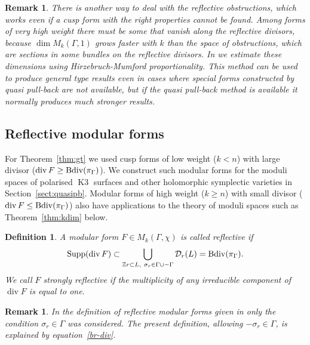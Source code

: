 \documentclass[a4paper,11pt]{article}
\newtheorem{definition}[lemma]{Definition}
\newtheorem{remark}[lemma]{Remark}
\newcommand{\ZZ}{\mathbb Z}
\renewcommand{\cD}{\mathcal D}
\newcommand{\supp}{\mathop{\null\mathrm {Supp}}\nolimits}
\newcommand{\Bdiv}{\mathop{\null\mathrm {Bdiv}}\nolimits}
\renewcommand{\div}{\mathop{\mathrm {div}}\nolimits}
\newcommand{\Kthree}{\mathop{\mathrm {K3}}\nolimits}
\begin{document}
\begin{remark}\label{rem:hm}
There is another way to deal with the reflective obstructions, which
works even if a cusp form with the right properties cannot be
found. Among forms of very high weight there must be some that vanish
along the reflective divisors, because $\dim M_k(\Gamma,1)$ grows
faster with $k$ than the space of obstructions, which are sections in
some bundles on the reflective divisors. In \cite{GHSprop} we estimate
these dimensions using Hirzebruch-Mumford proportionality. This method
can be used to produce general type results even in cases where
special forms constructed by quasi pull-back are not available, but
if the quasi pull-back method is available it normally produces much
stronger results.
\end{remark}

\subsection{Reflective modular forms}\label{subsect:reflectivemodfm}

For Theorem~\ref{thm:gt} we used cusp forms of low weight ($k<n$)
with large divisor ($\div F  \ge  \Bdiv(\pi_\Gamma)$).
We construct such modular forms for the moduli spaces of polarised
$\Kthree$ surfaces and other holomorphic symplectic varieties in
Section~\ref{sect:quasipb}.  Modular forms of high weight ($k\ge n$) with
small divisor ($\div F \le \Bdiv(\pi_\Gamma)$) also have applications
to the theory of moduli spaces such as Theorem~\ref{thm:kdim} below.

\begin{definition}\label{def:reflectivefm}
A modular form $F\in M_k(\Gamma,\chi)$ is called \emph{reflective} if
\begin{equation*}
\supp (\div F) \subset \bigcup_{\ZZ{r}\subset L,\ \sigma_r\in \Gamma\cup-\Gamma} \cD_r(L)
=\Bdiv(\pi_\Gamma).
\end{equation*}
We call $F$ \emph{strongly reflective} if the multiplicity of any
irreducible component of $\div F$ is equal to one.
\end{definition}

\begin{remark}\label{rem:defreflective}
In the definition of reflective modular forms given in \cite{GN2} only
the condition $\sigma_r\in \Gamma$ was considered.  The present
definition, allowing $-\sigma_r\in\Gamma$, is explained by
equation~\eqref{br-div}.
\end{remark}
\end{document}
